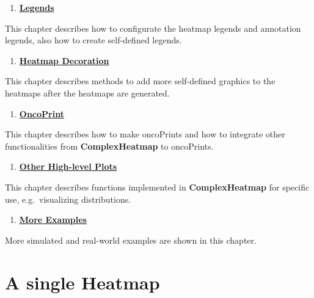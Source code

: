 \documentclass[]{book}
\providecommand{\tightlist}{%
  \setlength{\itemsep}{0pt}\setlength{\parskip}{0pt}}
\theoremstyle{definition}
\theoremstyle{definition}
\theoremstyle{definition}
\theoremstyle{remark}
\begin{document}
\begin{enumerate}
\def\labelenumi{\arabic{enumi}.}
\setcounter{enumi}{3}
\tightlist
\item
  \href{legends.html}{\textbf{Legends}}
\end{enumerate}

This chapter describes how to configurate the heatmap legends and
annotation legends, also how to create self-defined legends.

\begin{enumerate}
\def\labelenumi{\arabic{enumi}.}
\setcounter{enumi}{4}
\tightlist
\item
  \href{heatmap-decoration.html}{\textbf{Heatmap Decoration}}
\end{enumerate}

This chapter describes methods to add more self-defined graphics to the
heatmaps after the heatmaps are generated.

\begin{enumerate}
\def\labelenumi{\arabic{enumi}.}
\setcounter{enumi}{5}
\tightlist
\item
  \href{oncoprint.html}{\textbf{OncoPrint}}
\end{enumerate}

This chapter describes how to make oncoPrints and how to integrate other
functionalities from \textbf{ComplexHeatmap} to oncoPrints.

\begin{enumerate}
\def\labelenumi{\arabic{enumi}.}
\setcounter{enumi}{6}
\tightlist
\item
  \href{other-high-level-plots.html}{\textbf{Other High-level Plots}}
\end{enumerate}

This chapter describes functions implemented in \textbf{ComplexHeatmap}
for specific use, e.g.~visualizing distributions.

\begin{enumerate}
\def\labelenumi{\arabic{enumi}.}
\setcounter{enumi}{7}
\tightlist
\item
  \href{more-examples.html}{\textbf{More Examples}}
\end{enumerate}

More simulated and real-world examples are shown in this chapter.

\chapter{A single Heatmap}\label{a-single-heatmap}
\end{document}
